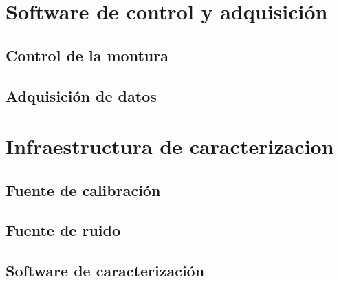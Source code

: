 \section{Software de control y adquisición}

\subsection{Control de la montura}

\subsection{Adquisición de datos}

\section{Infraestructura de caracterizacion}

\subsection{Fuente de calibración}

\subsection{Fuente de ruido}

\subsection{Software de caracterización}